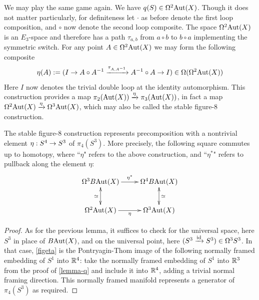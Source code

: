 \documentclass{amsart}
\begin{document}
\begin{constr}%
\label{figeta}
We may play the same game again.  We have $q(S) \in \Omega^2 \mathrm{Aut}(X)$.  Though it does not matter particularly, for definiteness let $\cdot$ as before denote the first loop composition, and $\circ$ now denote the second loop composite.  The space $\Omega^2 \mathrm{Aut}(X)$ is an $E_3$-space and therefore has a path $\tau_{a,b}$ from $a \circ b$ to $b \circ a$ implementing the symmetric switch.  For any point $A \in \Omega^2 \mathrm{Aut}(X)$ we may form the following composite
\[
\eta(A) := (I \rightarrow A \circ A^{-1} \xrightarrow{\tau_{A,A^{-1}}} A^{-1} \circ A \rightarrow I) \in \Omega(\Omega^2 \mathrm{Aut}(X))
\]
Here $I$ now denotes the trivial double loop at the identity automorphism.  This construction provides a map $\pi_2(\mathrm{Aut}(X)) \xrightarrow{\eta} \pi_3(\mathrm{Aut}(X))$, in fact a map $\Omega^2 \mathrm{Aut}(X) \xrightarrow{\eta} \Omega^3 \mathrm{Aut}(X)$, which may also be called the stable figure-8 construction.
\end{constr}

\begin{lemma} 
\label{lemma-eta}
The stable figure-8 construction represents precomposition with a nontrivial element $\eta: S^4 \rightarrow S^3$ of $\pi_4(S^3)$.  More precisely, the following square commutes up to homotopy, where ``$\eta$" refers to the above construction, and ``$\eta^\ast$" refers to pullback along the element $\eta$:
\[
\xymatrix{
\Omega^3 B\Aut(X) \ar[r]^{\eta^\ast} \ar@{<->}[d]_{\simeq} & \Omega^4 B\Aut(X)  \ar@{<->}[d]^{\simeq} \\
\Omega^2 \Aut(X) \ar[r]_{\eta} & \Omega^3 \Aut(X)
}
\]
\end{lemma}

\begin{proof}
As for the previous lemma, it suffices to check for the universal space, here $S^3$ in place of $B\mathrm{Aut}(X)$, and on the universal point, here $(S^3 \xrightarrow{\mathrm{id}} S^3) \in \Omega^3 S^3$.  In that case, \cref{figeta} is the Pontryagin-Thom image of the following normally framed embedding of $S^1$ into $\mathbb R^4$: take the normally framed embedding of $S^1$ into $\mathbb R^3$ from the proof of \cref{lemma-q} and include it into $\mathbb R^4$, adding a trivial normal framing direction.  This normally framed manifold represents a generator of $\pi_4(S^3)$ as required.
\end{proof}
\end{document}

